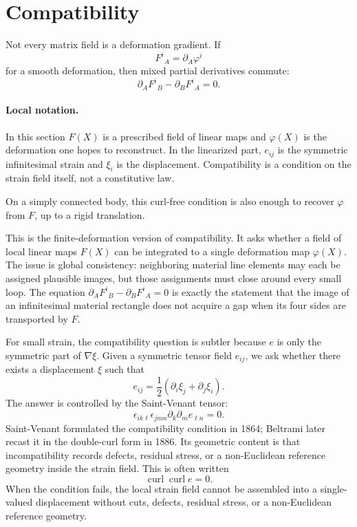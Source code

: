 \section{Compatibility}
\label{sec:elastic-compatibility}

Not every matrix field is a deformation gradient. If
\[
  F^i{}_A=\partial_A\varphi^i
\]
for a smooth deformation, then mixed partial derivatives commute:
\[
  \boxed{
  \partial_AF^i{}_B-\partial_BF^i{}_A=0.
  }
\]

\paragraph{Local notation.}
In this section \(F(X)\) is a prescribed field of linear maps and
\(\varphi(X)\) is the deformation one hopes to reconstruct.  In the
linearized part, \(e_{ij}\) is the symmetric infinitesimal strain and
\(\xi_i\) is the displacement.  Compatibility is a condition on the strain
field itself, not a constitutive law.

On a simply connected body, this curl-free condition is also enough to recover
\(\varphi\) from \(F\), up to a rigid translation.

This is the finite-deformation version of compatibility.  It asks whether a
field of local linear maps \(F(X)\) can be integrated to a single deformation
map \(\varphi(X)\).  The issue is global consistency: neighboring material
line elements may each be assigned plausible images, but those assignments
must close around every small loop.  The equation
\(\partial_AF^i{}_B-\partial_BF^i{}_A=0\) is exactly the statement that the
image of an infinitesimal material rectangle does not acquire a gap when its
four sides are transported by \(F\).

For small strain, the compatibility question is subtler because \(e\) is only
the symmetric part of \(\nabla\xi\). Given a symmetric tensor field \(e_{ij}\),
we ask whether there exists a displacement \(\xi\) such that
\[
  e_{ij}=\frac12(\partial_i\xi_j+\partial_j\xi_i).
\]
The answer is controlled by the Saint-Venant tensor:
\[
  \boxed{
  \epsilon_{ik\ell}\epsilon_{jmn}
  \partial_k\partial_m e_{\ell n}=0.
  }
\]
Saint-Venant formulated the compatibility condition in 1864; Beltrami later
recast it in the double-curl form in 1886. Its geometric content is that
incompatibility records defects, residual stress, or a non-Euclidean reference
geometry inside the strain field.
This is often written
\[
  \operatorname{curl}\operatorname{curl} e=0.
\]
When the condition fails, the local strain field cannot be assembled into a
single-valued displacement without cuts, defects, residual stress, or a
non-Euclidean reference geometry.

